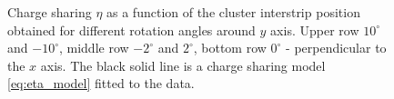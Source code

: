 \begin{figure}[tbph]
\begin{center}
\caption{Charge sharing $\eta$ as a function of the cluster interstrip position obtained for different rotation angles around $y$ axis. Upper row $10^{\circ}$ and $-10^{\circ}$, middle row $-2^{\circ}$ and $2^{\circ}$, bottom row $0^{\circ}$ - perpendicular to the $x$ axis. The black solid line is a charge sharing model \ref{eq:eta_model} fitted to the data. }
\label{fig:eta_fit}
 \end{center}
 \end{figure}